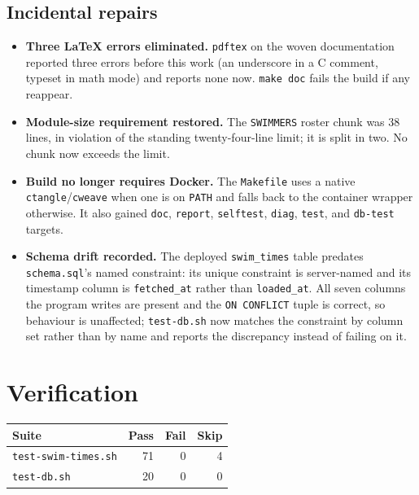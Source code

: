 \documentclass[11pt]{article}
\newcommand{\code}[1]{\texttt{#1}}
\begin{document}
\subsection{Incidental repairs}

\begin{itemize}[leftmargin=*]
\item \textbf{Three \LaTeX{} errors eliminated.}  \code{pdftex} on the
      woven documentation reported three errors before this work (an
      underscore in a C comment, typeset in math mode) and reports none
      now.  \code{make doc} fails the build if any reappear.
\item \textbf{Module-size requirement restored.}  The \code{SWIMMERS}
      roster chunk was 38 lines, in violation of the standing
      twenty-four-line limit; it is split in two.  No chunk now exceeds
      the limit.
\item \textbf{Build no longer requires Docker.}  The \code{Makefile}
      uses a native \code{ctangle}/\code{cweave} when one is on
      \code{PATH} and falls back to the container wrapper otherwise.
      It also gained \code{doc}, \code{report}, \code{selftest},
      \code{diag}, \code{test}, and \code{db-test} targets.
\item \textbf{Schema drift recorded.}  The deployed \code{swim\_times}
      table predates \code{schema.sql}'s named constraint: its unique
      constraint is server-named and its timestamp column is
      \code{fetched\_at} rather than \code{loaded\_at}.  All seven
      columns the program writes are present and the \code{ON CONFLICT}
      tuple is correct, so behaviour is unaffected; \code{test-db.sh}
      now matches the constraint by column set rather than by name and
      reports the discrepancy instead of failing on it.
\end{itemize}

\section{Verification}

\begin{center}
\begin{tabular}{lrrr}
\toprule
\textbf{Suite} & \textbf{Pass} & \textbf{Fail} & \textbf{Skip} \\
\midrule
\code{test-swim-times.sh} & 71 & 0 & 4 \\
\code{test-db.sh}         & 20 & 0 & 0 \\
\bottomrule
\end{tabular}
\end{center}
\end{document}
